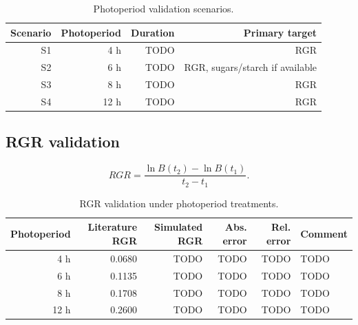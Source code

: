 \documentclass[a4paper,fleqn]{cas-dc}
\begin{document}
\begin{table}[ht]
\centering
\caption{Photoperiod validation scenarios.}
\label{tab:scenarios}
\begin{tabular}{rrrr}
\hline
\textbf{Scenario} & \textbf{Photoperiod} & \textbf{Duration} & \textbf{Primary target} \\
\hline
S1 & 4 h  & TODO & RGR \\
S2 & 6 h  & TODO & RGR, sugars/starch if available \\
S3 & 8 h  & TODO & RGR \\
S4 & 12 h & TODO & RGR \\
\hline
\end{tabular}
\end{table}

\subsection{RGR validation}

\begin{equation}
RGR =
\frac{\ln B(t_2) - \ln B(t_1)}
{t_2 - t_1}.
\end{equation}


\begin{table}[ht]
\centering
\caption{RGR validation under photoperiod treatments.}
\label{tab:rgr_validation}
\begin{tabular}{rrrrr p{}}
\hline
\textbf{Photoperiod} & \textbf{Literature RGR} & \textbf{Simulated RGR} &
\textbf{Abs. error} & \textbf{Rel. error} & \textbf{Comment} \\
\hline
4 h  & 0.0680 & TODO & TODO & TODO & TODO \\
6 h  & 0.1135 & TODO & TODO & TODO & TODO \\
8 h  & 0.1708 & TODO & TODO & TODO & TODO \\
12 h & 0.2600 & TODO & TODO & TODO & TODO \\
\hline
\end{tabular}
\end{table}
\end{document}
